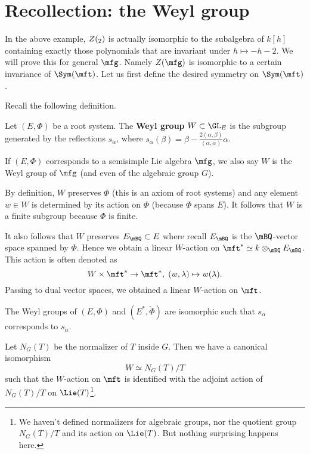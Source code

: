 \section{Recollection: the Weyl group}

In the above example, $Z(\sl_2)$ is actually isomorphic to the subalgebra of $k[h]$ containing exactly those polynomials that are invariant under $h\mapsto -h-2$. We will prove this for general $\mfg$. Namely $Z(\mfg)$ is isomorphic to a certain invariance of $\Sym(\mft)$. Let us first define the desired symmetry on $\Sym(\mft)$.

Recall the following definition.

\begin{defn}
	Let $(E,\Phi)$ be a root system. The \textbf{Weyl group} $W\subset \GL_E$ is the subgroup generated by the reflections $s_\alpha$, where $s_\alpha(\beta) = \beta - \frac{2(\alpha,\beta)}{(\alpha,\alpha)} \alpha$.

	If $(E,\Phi)$ corresponds to a semisimple Lie algebra $\mfg$, we also say $W$ is the Weyl group of $\mfg$ (and even of the algebraic group $G$).
\end{defn}

\begin{rem}
	By definition, $W$ preserves $\Phi$ (this is an axiom of root systems) and any element $w\in W$ is determined by its action on $\Phi$ (because $\Phi$ spans $E$). It follows that $W$ is a finite subgroup because $\Phi$ is finite.
\end{rem}



\begin{rem}
	It also follows that $W$ preserves $E_\mBQ\subset E$ where recall $E_\mBQ$ is the $\mBQ$-vector space spanned by $\Phi$. Hence we obtain a linear $W$-action on $\mft^* \simeq k\ot_\mBQ E_\mBQ$. This action is often denoted as
	\[
		W\times \mft^* \to \mft^*,\; (w,\lambda)\mapsto w(\lambda).
	\]
	Passing to dual vector spaces, we obtained a linear $W$-action on $\mft$.
\end{rem}

\begin{rem}
	The Weyl groups of $(E,\Phi)$ and $(E^*,\check\Phi)$ are isomorphic such that $s_\alpha$ corresponds to $s_{\check \alpha}$.
\end{rem}

\begin{prop}
	Let $N_G(T)$ be the normalizer of $T$ inside $G$. Then we have a canonical isomorphism
	\[
		W\simeq N_G(T)/T
	\]
	such that the $W$-action on $\mft$ is identified with the adjoint action of $N_G(T)/T$ on $\Lie(T)$\footnote{We haven't defined normalizers for algebraic groups, nor the quotient group $N_G(T)/T$ and its action on $\Lie(T)$. But nothing surprising happens here.}.
\end{prop}

